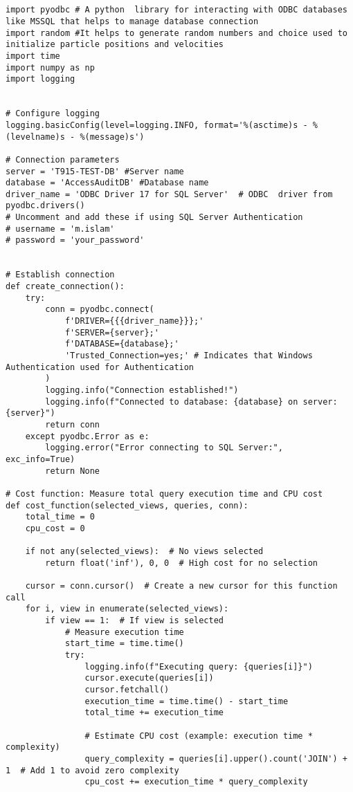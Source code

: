 \begin{lstlisting}[style=pythonstyle, caption={Python script to automate optimal view.}, label={lst:fullCode}]


import pyodbc # A python  library for interacting with ODBC databases like MSSQL that helps to manage database connection
import random #It helps to generate random numbers and choice used to initialize particle positions and velocities
import time
import numpy as np
import logging


# Configure logging
logging.basicConfig(level=logging.INFO, format='%(asctime)s - %(levelname)s - %(message)s')

# Connection parameters
server = 'T915-TEST-DB' #Server name
database = 'AccessAuditDB' #Database name
driver_name = 'ODBC Driver 17 for SQL Server'  # ODBC  driver from pyodbc.drivers()
# Uncomment and add these if using SQL Server Authentication
# username = 'm.islam'
# password = 'your_password'


# Establish connection
def create_connection():
    try:
        conn = pyodbc.connect(
            f'DRIVER={{{driver_name}}};'
            f'SERVER={server};'
            f'DATABASE={database};'
            'Trusted_Connection=yes;' # Indicates that Windows Authentication used for Authentication
        )
        logging.info("Connection established!")
        logging.info(f"Connected to database: {database} on server: {server}")
        return conn
    except pyodbc.Error as e:
        logging.error("Error connecting to SQL Server:", exc_info=True)
        return None

# Cost function: Measure total query execution time and CPU cost
def cost_function(selected_views, queries, conn):
    total_time = 0
    cpu_cost = 0

    if not any(selected_views):  # No views selected
        return float('inf'), 0, 0  # High cost for no selection

    cursor = conn.cursor()  # Create a new cursor for this function call
    for i, view in enumerate(selected_views):
        if view == 1:  # If view is selected
            # Measure execution time
            start_time = time.time()
            try:
                logging.info(f"Executing query: {queries[i]}")
                cursor.execute(queries[i])
                cursor.fetchall()
                execution_time = time.time() - start_time
                total_time += execution_time

                # Estimate CPU cost (example: execution time * complexity)
                query_complexity = queries[i].upper().count('JOIN') + 1  # Add 1 to avoid zero complexity
                cpu_cost += execution_time * query_complexity


\end{lstlisting}
